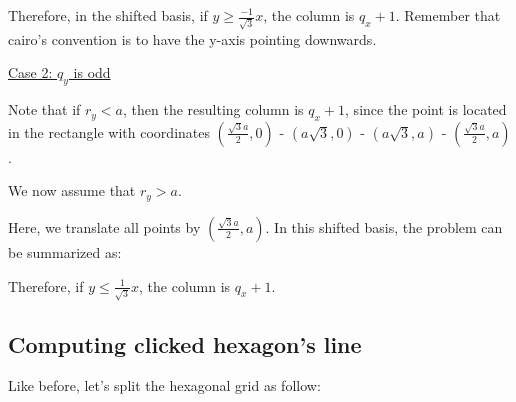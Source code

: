 \documentclass{article}
\begin{document}
\begin{center}
\end{center}

Therefore, in the shifted basis, if $y \geq \frac{-1}{\sqrt{3}}x$, the column is $q_x+1$. Remember that cairo's convention is to have the y-axis pointing downwards.

\underline{Case 2: $q_y$ is odd}

Note that if $r_y < a$, then the resulting column is $q_x +1$, since the point is located in the rectangle with coordinates $(\frac{\sqrt{3}a}{2}, 0)$ - $(a\sqrt{3}, 0)$ - $(a\sqrt{3}, a)$ - $(\frac{\sqrt{3}a}{2}, a)$.

We now assume that $r_y > a$.

Here, we translate all points by $(\frac{\sqrt{3}a}{2},a)$. In this shifted basis, the problem can be summarized as:
\begin{center}
\end{center}

Therefore, if $y \leq \frac{1}{\sqrt{3}}x$, the column is $q_x+1$.

\subsection{Computing clicked hexagon's line}
Like before, let's split the hexagonal grid as follow:
\end{document}
